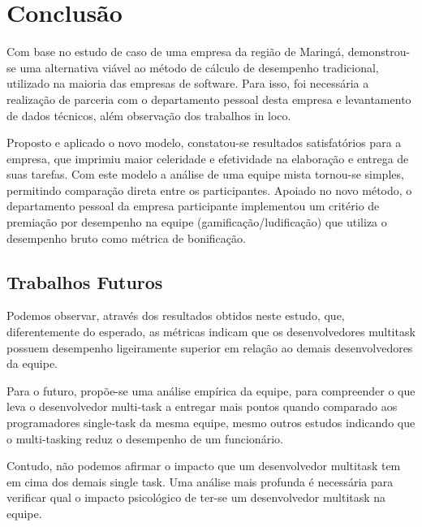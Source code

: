 \section{Conclusão}
Com base no estudo de caso de uma empresa da região de Maringá, demonstrou-se uma alternativa viável ao método de cálculo de desempenho tradicional, utilizado na maioria das empresas de software. Para isso, foi necessária a realização de parceria com o departamento pessoal desta empresa e levantamento de dados técnicos, além observação dos trabalhos in loco.\par

Proposto e aplicado o novo modelo, constatou-se resultados satisfatórios para a empresa, que imprimiu maior celeridade e efetividade na elaboração e entrega de suas tarefas. Com este modelo a análise de uma equipe mista tornou-se simples, permitindo comparação direta entre os participantes. Apoiado no novo método, o departamento pessoal da empresa participante implementou um critério de premiação por desempenho na equipe (gamificação/ludificação) que utiliza o desempenho bruto como métrica de bonificação.\par


\subsection{Trabalhos Futuros}
Podemos observar, através dos resultados obtidos neste estudo, que, diferentemente do esperado, as métricas indicam que os desenvolvedores multitask possuem desempenho ligeiramente superior em relação ao demais desenvolvedores da equipe.\par

Para o futuro, propõe-se uma análise empírica da equipe, para compreender o que leva o desenvolvedor multi-task a entregar mais pontos quando comparado aos programadores single-task da mesma equipe, mesmo outros estudos indicando que o multi-tasking reduz o desempenho de um funcionário.\par 


Contudo, não podemos afirmar o impacto que um desenvolvedor multitask tem em cima dos demais single task. Uma análise mais profunda é necessária para verificar qual o impacto psicológico de ter-se um desenvolvedor multitask na equipe.